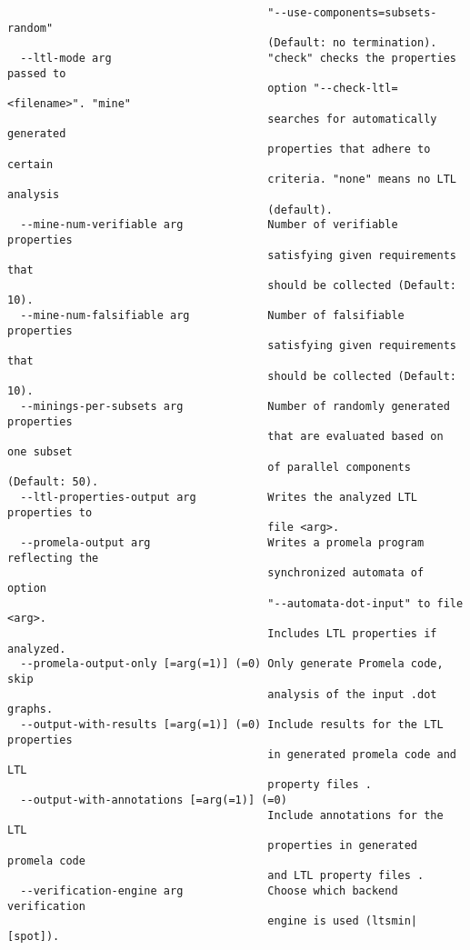 \documentclass[natbib]{article}
\begin{document}
\begin{verbatim}
                                        "--use-components=subsets-random" 
                                        (Default: no termination).
  --ltl-mode arg                        "check" checks the properties passed to
                                        option "--check-ltl=<filename>". "mine"
                                        searches for automatically generated 
                                        properties that adhere to certain 
                                        criteria. "none" means no LTL analysis 
                                        (default).
  --mine-num-verifiable arg             Number of verifiable properties 
                                        satisfying given requirements that 
                                        should be collected (Default: 10).
  --mine-num-falsifiable arg            Number of falsifiable properties 
                                        satisfying given requirements that 
                                        should be collected (Default: 10).
  --minings-per-subsets arg             Number of randomly generated properties
                                        that are evaluated based on one subset 
                                        of parallel components (Default: 50).
  --ltl-properties-output arg           Writes the analyzed LTL properties to 
                                        file <arg>.
  --promela-output arg                  Writes a promela program reflecting the
                                        synchronized automata of option 
                                        "--automata-dot-input" to file <arg>. 
                                        Includes LTL properties if analyzed.
  --promela-output-only [=arg(=1)] (=0) Only generate Promela code, skip 
                                        analysis of the input .dot graphs.
  --output-with-results [=arg(=1)] (=0) Include results for the LTL properties 
                                        in generated promela code and LTL 
                                        property files .
  --output-with-annotations [=arg(=1)] (=0)
                                        Include annotations for the LTL 
                                        properties in generated promela code 
                                        and LTL property files .
  --verification-engine arg             Choose which backend verification 
                                        engine is used (ltsmin|[spot]).
\end{verbatim}
\end{document}
